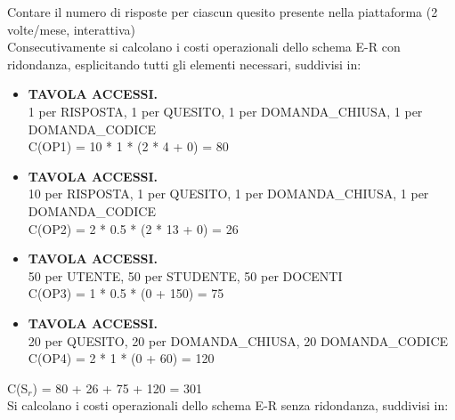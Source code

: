 \documentclass{article}
\begin{document}
\hspace*{5pt}Contare il numero di risposte per ciascun quesito presente nella piattaforma (2 volte/mese, \hspace*{5pt}interattiva) \vspace*{7pt}\\
Consecutivamente si calcolano i costi operazionali dello schema E-R con ridondanza, esplicitando tutti gli elementi necessari, suddivisi in:
\begin{itemize}[label={-}]
    \itemsep0em 
    \item {\small\textbf{TAVOLA ACCESSI.} \\ 1 per RISPOSTA, 1 per QUESITO, 1 per DOMANDA\_CHIUSA, 1 per DOMANDA\_CODICE} \vspace*{2pt}\\ C(OP1) = 10 * 1 * (2 * 4 + 0) = 80 \vspace*{2pt} 
    \item {\small\textbf{TAVOLA ACCESSI.} \\ 10 per RISPOSTA, 1 per QUESITO, 1 per DOMANDA\_CHIUSA, 1 per DOMANDA\_CODICE} \vspace*{2pt}\\ C(OP2) = 2 * 0.5 * (2 * 13 + 0) = 26 \vspace*{2pt}
    \item {\small\textbf{TAVOLA ACCESSI.} \\ 50 per UTENTE, 50 per STUDENTE, 50 per DOCENTI} \vspace*{2pt}\\ C(OP3) = 1 * 0.5 * (0 + 150) = 75
    \item {\small\textbf{TAVOLA ACCESSI.} \\ 20 per QUESITO, 20 per DOMANDA\_CHIUSA, 20 DOMANDA\_CODICE } \vspace*{1pt}\\ C(OP4) = 2 * 1 * (0 + 60) = 120
\end{itemize}
\hspace*{15pt}C(S$_r$) = 80 + 26 + 75 + 120 = 301 \vspace*{7pt}\\
Si calcolano i costi operazionali dello schema E-R senza ridondanza, suddivisi in:
\end{document}
